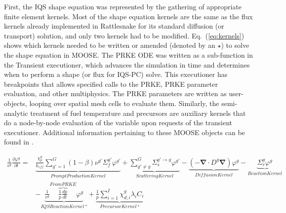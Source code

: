 \documentclass{elsarticle}
\newcommand{\bs}[1]{\mathbf{#1}}
\renewcommand{\div}{\bs{\nabla}\! \cdot \!}
\newcommand{\grad}{\bs{\nabla}}
\newcommand{\eqt}[1]{Eq.~(\ref{#1})}                     %
\newcommand{\keff}{k_\textit{eff}}
\newcommand{\iqspc}{IQS-PC\xspace}
\begin{document}
First, the IQS shape equation was represented by the gathering of appropriate finite element kernels. Most of the shape equation kernels are the same as the flux kernels already implemented in Rattlesnake for its standard diffusion (or transport) solution, and only two kernels had to be modified. \eqt{eq:kernels} shows which kernels needed to be written or amended (denoted by an $\star$) to solve the shape equation in MOOSE. The PRKE ODE was written as a sub-function in the Transient executioner, which advances the simulation in time and determines when to perform a shape (or flux for \iqspc) solve. This executioner has breakpoints that allows specified calls to the PRKE, PRKE parameter evaluation, and other multiphysics. The PRKE parameters are written as user-objects, looping over spatial mesh cells to evaluate them. Similarly, the semi-analytic treatment of fuel temperature and precursors are auxiliary kernels that do a node-by-node evaluation of the variable upon requests of the transient executioner. Additional information pertaining to these MOOSE objects can be found in \cite{PrinceTR2016}.

\begin{align}
\frac{1}{v^g}\frac{\partial\varphi^g}{\partial t}=&\underbrace{\frac{\chi_p^g}{\keff} \sum_{g'=1}^G (1-\beta) \nu^{g'} \Sigma_f^{g'} \varphi^{g'}}_{Prompt Production Kernel} + \underbrace{\sum_{g'\neq g}^G\Sigma_s^{g'\to g} \varphi^{g'}}_{Scattering Kernel} - \underbrace{\left( -\div D^g \grad \right)\varphi^g}_{Diffusion Kernel} - \underbrace{\Sigma_r^g\varphi^g}_{Reaction Kernel} \nonumber \\
& - \underbrace{\frac{1}{v^g} \boxed{\overbrace{\frac{1}{p}\frac{dp}{dt}}^{From PRKE}}\varphi^g}_{IQS Reaction Kernel\ ^\star}+\underbrace{\frac{1}{p}\sum_{i=1}^I\chi_{d,i}^g\lambda_iC_i}_{Precursor Kernel\ ^\star}
\label{eq:kernels}
\end{align}


\end{document}
